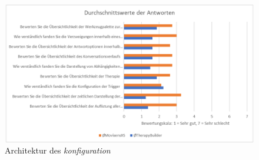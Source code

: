 \begin{figure}[h]
\centering
\includegraphics[width=1\textwidth]{pictures/diagramme/antwortendurchsch2}
\caption{Architektur des \emph{konfiguration}}
\label{antwortendurchsch2}
\end{figure}

